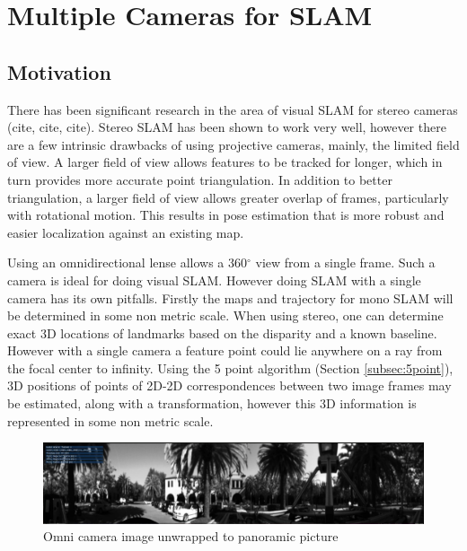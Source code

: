 \chapter{Multiple Cameras for SLAM}
\label{chapter:MultiCamSLAM}

\section{Motivation}

There has been significant research in the area of visual SLAM for stereo cameras (cite, cite, cite).  Stereo SLAM has been shown to work very well, however there are a few intrinsic drawbacks of using projective cameras, mainly, the limited field of view.  A larger field of view allows features to be tracked for longer, which in turn provides more accurate point triangulation.  In addition to better triangulation, a larger field of view allows greater overlap of frames, particularly with rotational motion.  This results in pose estimation that is more robust and easier localization against an existing map. %

Using an omnidirectional lense allows a 360$^{\circ}$ view from a single frame.  Such a camera is ideal for doing visual SLAM.  However doing SLAM with a single camera has its own pitfalls.  Firstly the maps and trajectory for mono SLAM will be determined in some non metric scale.  When using stereo, one can determine exact 3D locations of landmarks based on the disparity and a known baseline.  However with a single camera a feature point could lie anywhere on a ray from the focal center to infinity.  Using the 5 point algorithm (Section \ref{subsec:5point}), 3D positions of points of 2D-2D correspondences between two image frames may be estimated, along with a transformation, however this 3D information is represented in some non metric scale.

\begin{figure}[h!]
  \centering
    \includegraphics[width=1.0\textwidth]{chapters/images/unwrapped}
    \caption{Omni camera image unwrapped to panoramic picture}
  \label{fig:unwrapped}
\end{figure}

